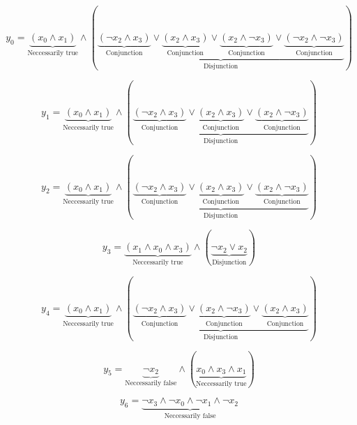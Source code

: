 \documentclass{scrartcl}
\begin{document}
	
\begin{equation}
	y_0 = \underbrace{\left(x_0 \wedge x_1\right)}_{\text{Neccessarily true}} \wedge (\underbrace{\underbrace{\left( \lnot x_2 \wedge x_3\right)}_{\text{Conjunction}} \lor \underbrace{\left(x_2 \wedge x_3\right)}_{\text{Conjunction}} \lor \underbrace{\left(x_2 \wedge  \lnot x_3\right)}_{\text{Conjunction}} \lor \underbrace{\left( \lnot x_2 \wedge  \lnot x_3\right)}_{\text{Conjunction}}}_{\text{Disjunction}})
\end{equation}

\begin{equation}
	y_1 = \underbrace{\left(x_0 \wedge x_1\right)}_{\text{Neccessarily true}} \wedge (\underbrace{\underbrace{\left( \lnot x_2 \wedge x_3\right)}_{\text{Conjunction}} \lor \underbrace{\left(x_2 \wedge x_3\right)}_{\text{Conjunction}} \lor \underbrace{\left(x_2 \wedge  \lnot x_3\right)}_{\text{Conjunction}}}_{\text{Disjunction}})
\end{equation}

\begin{equation}
	y_2 = \underbrace{\left(x_0 \wedge x_1\right)}_{\text{Neccessarily true}} \wedge (\underbrace{\underbrace{\left( \lnot x_2 \wedge x_3\right)}_{\text{Conjunction}} \lor \underbrace{\left(x_2 \wedge x_3\right)}_{\text{Conjunction}} \lor \underbrace{\left(x_2 \wedge  \lnot x_3\right)}_{\text{Conjunction}}}_{\text{Disjunction}})
\end{equation}

\begin{equation}
	y_3 = \underbrace{\left(x_1 \wedge x_0 \wedge x_3\right)}_{\text{Neccessarily true}} \wedge (\underbrace{ \lnot x_2 \lor x_2}_{\text{Disjunction}})
\end{equation}

\begin{equation}
	y_4 = \underbrace{\left(x_0 \wedge x_1\right)}_{\text{Neccessarily true}} \wedge (\underbrace{\underbrace{\left( \lnot x_2 \wedge x_3\right)}_{\text{Conjunction}} \lor \underbrace{\left(x_2 \wedge  \lnot x_3\right)}_{\text{Conjunction}} \lor \underbrace{\left(x_2 \wedge x_3\right)}_{\text{Conjunction}}}_{\text{Disjunction}})
\end{equation}

\begin{equation}
	y_5 = \underbrace{ \lnot x_2}_{\text{Neccessarily false}} \wedge (\underbrace{x_0 \wedge x_3 \wedge x_1}_{\text{Neccessarily true}})
\end{equation}

\begin{equation}
	y_6 = \underbrace{ \lnot x_3 \wedge  \lnot x_0 \wedge  \lnot x_1 \wedge  \lnot x_2}_{\text{Neccessarily false}}
\end{equation}
\end{document}
